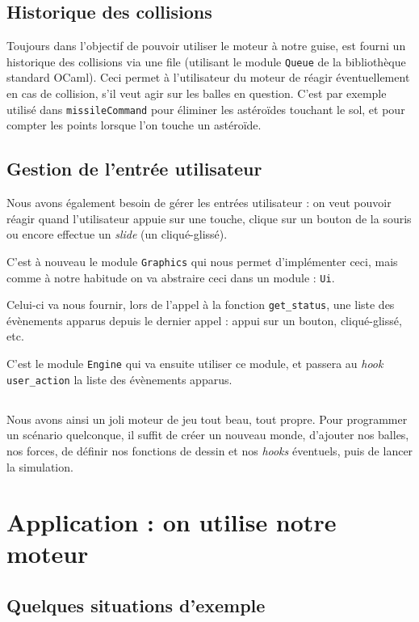 \documentclass[a4paper]{scrartcl}
\begin{document}
\subsection{Historique des collisions}
Toujours dans l'objectif de pouvoir utiliser le moteur à notre guise,
est fourni un historique des collisions via une file (utilisant le
module \texttt{Queue} de la bibliothèque standard OCaml). Ceci permet
à l'utilisateur du moteur de réagir éventuellement en cas de
collision, s'il veut agir sur les balles en question. C'est par
exemple utilisé dans \texttt{missileCommand} pour éliminer les
astéroïdes touchant le sol, et pour compter les points lorsque l'on
touche un astéroïde.

\subsection{Gestion de l'entrée utilisateur}
Nous avons également besoin de gérer les entrées utilisateur : on veut
pouvoir réagir quand l'utilisateur appuie sur une touche, clique sur
un bouton de la souris ou encore effectue un \emph{slide} (un
cliqué-glissé).

C'est à nouveau le module \texttt{Graphics} qui nous permet
d'implémenter ceci, mais comme à notre habitude on va abstraire ceci
dans un module : \texttt{Ui}.

Celui-ci va nous fournir, lors de l'appel à la fonction
\texttt{get\_status}, une liste des évènements apparus depuis le
dernier appel : appui sur un bouton, cliqué-glissé, etc.

C'est le module \texttt{Engine} qui va ensuite utiliser ce module, et
passera au \emph{hook} \texttt{user\_action} la liste des évènements
apparus.

\subsection*{}
Nous avons ainsi un joli moteur de jeu tout beau, tout propre. Pour
programmer un scénario quelconque, il suffit de créer un nouveau
monde, d'ajouter nos balles, nos forces, de définir nos fonctions de
dessin et nos \emph{hooks} éventuels, puis de lancer la simulation.


\section{Application : on utilise notre moteur}
\label{applications}

\subsection{Quelques situations d'exemple}
\end{document}
